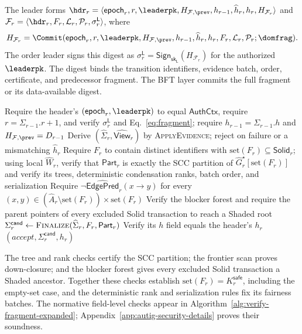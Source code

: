 The leader forms $\hdr_r=\langle\mathsf{epoch}_r,r,\leaderpk,H_{\mathcal F,\prev}, h_{r-1},\widehat h_r,h_r,H_{\mathcal F_r}\rangle$ and $\mathcal F_r=\langle\hdr_r,F_r,\mathcal L_r,\mathcal P_r, \sigma_r^{\mathsf L}\rangle$, where
\begin{equation}
 H_{\mathcal F_r}=\Commit(\mathsf{epoch}_r,r,\leaderpk,
 H_{\mathcal F,\prev},h_{r-1},\widehat h_r,h_r,
 F_r,\mathcal L_r,\mathcal P_r;\domfrag).
 \label{eq:fragment}
\end{equation}
The order leader signs this digest as $\sigma_r^{\mathsf L} =\mathsf{Sign}_{\mathsf{sk}_{\mathsf L}}(H_{\mathcal F_r})$ for the authorized $\leaderpk$. The digest binds the transition identifiers, evidence batch, order, certificate, and predecessor fragment. The BFT layer commits the full fragment or its data-available digest.

\begin{algorithm}[h!]
\caption{\textsc{VerifyFragment}: Verify a Proof-Carrying Fragment}
\label{alg:verify-fragment}
\footnotesize
{}
Require the header's $(\mathsf{epoch}_r,\leaderpk)$ to equal $\mathsf{AuthCtx}$, require $r=\Sigma_{r-1}.r+1$, and verify $\sigma_r^{\mathsf L}$ and Eq.~\eqref{eq:fragment}; require $h_{r-1}=\Sigma_{r-1}.h$ and $H_{\mathcal F,\prev}=D_{r-1}$\;
Derive $(\widehat\Sigma_r,\widehat{\mathsf{View}}_r)$ by
\textsc{ApplyEvidence}; reject on failure or a mismatching $\widehat h_r$\;
Require $F_r$ to contain distinct identifiers with
$\mathrm{set}(F_r)\subseteq\mathsf{Solid}_r$; using local $\widehat W_r$,
verify that $\mathsf{Part}_r$ is exactly the SCC partition of $\widehat G_r^\star[\mathrm{set}(F_r)]$ and verify its trees, deterministic condensation ranks, batch order, and serialization\;
Require $\neg\widehat{\mathsf{EdgePred}}_r(x\to y)$ for every $(x,y)\in(\widehat A_r\setminus\mathrm{set}(F_r))
\times\mathrm{set}(F_r)$\;
Verify the blocker forest and require the parent pointers of every excluded Solid transaction to reach a Shaded root\; $\Sigma_r^{\mathsf{cand}}\gets
  \textsc{Finalize}(\widehat\Sigma_r,F_r,\mathsf{Part}_r)$\;
Verify its $h$ field equals the header's $h_r$\;
\KwRet $(accept,\Sigma_r^{\mathsf{cand}},h_r)$
\end{algorithm}

The tree and rank checks certify the SCC partition; the frontier scan proves down-closure; and the blocker forest gives every excluded Solid transaction a Shaded ancestor.  Together these checks establish $\mathrm{set}(F_r)=K_r^{\mathsf{safe}}$, including the empty-set case, and the deterministic rank and serialization rules fix its fairness batches. The normative field-level checks appear in Algorithm~\ref{alg:verify-fragment-expanded}; Appendix~\ref{app:autig-security-details} proves their soundness.

